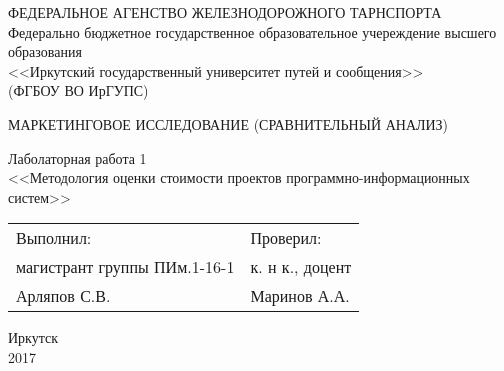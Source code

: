 \begin{titlepage}
	\newpage
	\begin{center}
		ФЕДЕРАЛЬНОЕ АГЕНСТВО ЖЕЛЕЗНОДОРОЖНОГО ТАРНСПОРТА \\
		\vspace{14pt}
		Федерально бюджетное государственное образовательное учереждение высшего образования \\
		\vspace{14pt}
		<<Иркутский государственный университет путей и сообщения>> \\
		(ФГБОУ ВО ИрГУПС) \\
	\end{center}

	\vspace{14pt}


	\vspace{28pt}

	\begin{center}
		МАРКЕТИНГОВОЕ ИССЛЕДОВАНИЕ (СРАВНИТЕЛЬНЫЙ АНАЛИЗ)
	\end{center}

	\vspace{56pt}

	\begin{center}
		Лаболаторная работа {\No} 1 \\
		\vspace{14pt}
		<<Методология оценки стоимости проектов программно-информационных систем>> \\
	\end{center}

	\vspace{56pt}

	\begin{flushleft}
		\begin{tabular}{p{}l}
			Выполнил: &  Проверил: \\
			магистрант группы ПИм.1-16-1 &  к. н к., доцент \\
			Арляпов С.В. &  Маринов А.А. \\
		\end{tabular}
	\end{flushleft}

	\vspace{\fill}

	\begin{center}
	Иркутск \\ 2017
	\end{center}
\end{titlepage}
